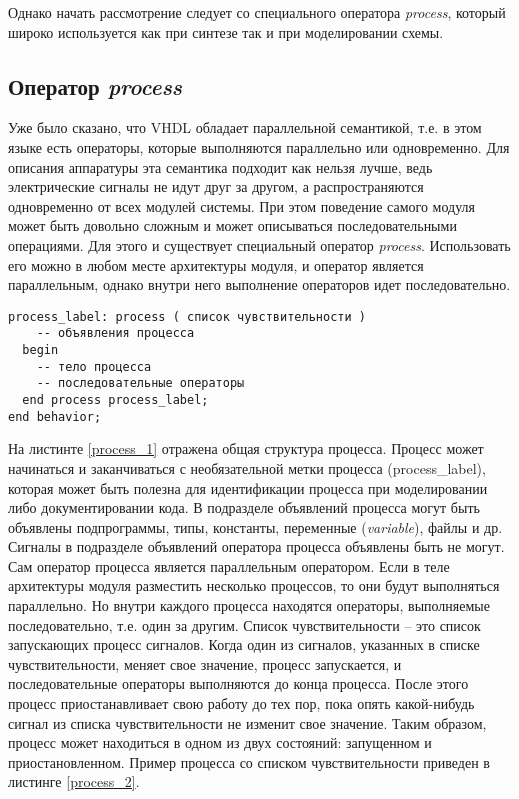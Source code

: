 Однако начать рассмотрение следует со специального оператора \emph{process}, который широко используется как при синтезе так и при моделировании схемы.

\subsection{Оператор \emph{process}}

Уже было сказано, что VHDL обладает параллельной семантикой, т.е. в этом языке есть операторы, которые выполняются параллельно или одновременно. Для описания аппаратуры эта семантика подходит как нельзя лучше, ведь электрические сигналы не идут друг за другом, а распространяются одновременно от всех модулей системы. При этом поведение самого модуля может быть довольно сложным и может описываться последовательными операциями. Для этого и существует специальный оператор \emph{process}. Использовать его можно в любом месте архитектуры модуля, и оператор является параллельным, однако внутри него выполнение операторов идет последовательно.


\begin{Code}
\begin{lstlisting}[caption=Оператор \emph{process},label=process_1]
  process_label: process ( список чувствительности )
    -- объявления процесса
  begin
    -- тело процесса
    -- последовательные операторы
  end process process_label;
end behavior;
\end{lstlisting}
\end{Code}

На листинте \ref{process_1} отражена общая структура процесса. Процесс может начинаться и заканчиваться с необязательной метки процесса (process\_label), которая может быть полезна для идентификации процесса при моделировании либо документировании кода. В подразделе объявлений  процесса могут быть объявлены подпрограммы, типы, константы, переменные (\emph{variable}), файлы и др. Сигналы в подразделе объявлений оператора процесса объявлены быть не могут. Сам оператор процесса является параллельным оператором. Если в  теле архитектуры модуля разместить несколько процессов, то они будут выполняться параллельно. Но внутри каждого процесса находятся операторы, выполняемые последовательно, т.е. один за другим. Список чувствительности – это список запускающих процесс сигналов. Когда один из сигналов, указанных в списке чувствительности, меняет свое значение, процесс запускается, и последовательные операторы выполняются до конца процесса. После этого процесс приостанавливает свою работу до тех пор, пока опять какой-нибудь сигнал из списка чувствительности не изменит свое значение. Таким образом, процесс может находиться в одном из двух состояний: запущенном и приостановленном.
Пример процесса со списком чувствительности приведен в листинге \ref{process_2}.

